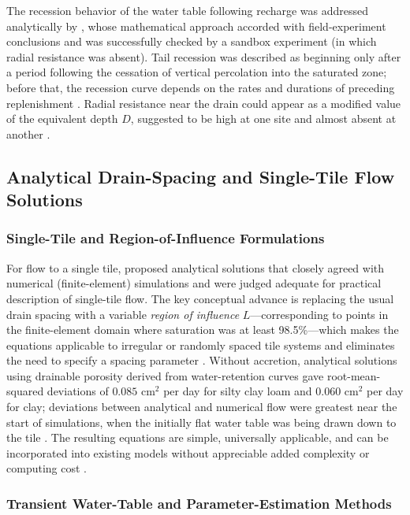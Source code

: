 \documentclass[11pt]{article}
\begin{document}
The recession behavior of the water table following recharge was addressed analytically
by \textcite{VANDELEUR1959}, whose mathematical approach accorded with field-experiment
conclusions and was successfully checked by a sandbox experiment (in which radial
resistance was absent). Tail recession was described as beginning only after a period
following the cessation of vertical percolation into the saturated zone; before that, the
recession curve depends on the rates and durations of preceding replenishment
\parencite{VANDELEUR1959}. Radial resistance near the drain could appear as a modified
value of the equivalent depth $D$, suggested to be high at one site and almost absent at
another \parencite{VANDELEUR1959}.

\subsection{Analytical Drain-Spacing and Single-Tile Flow Solutions}

\subsubsection{Single-Tile and Region-of-Influence Formulations}

For flow to a single tile, \textcite{Cooke2001} proposed analytical solutions that closely
agreed with numerical (finite-element) simulations and were judged adequate for practical
description of single-tile flow. The key conceptual advance is replacing the usual drain
spacing with a variable \emph{region of influence} $L$---corresponding to points in the
finite-element domain where saturation was at least 98.5\%---which makes the equations
applicable to irregular or randomly spaced tile systems and eliminates the need to specify
a spacing parameter \parencite{Cooke2001}. Without accretion, analytical solutions using
drainable porosity derived from water-retention curves gave root-mean-squared deviations
of $0.085$ cm$^2$ per day for silty clay loam and $0.060$ cm$^2$ per day for clay;
deviations between analytical and numerical flow were greatest near the start of
simulations, when the initially flat water table was being drawn down to the tile
\parencite{Cooke2001}. The resulting equations are simple, universally applicable, and can
be incorporated into existing models without appreciable added complexity or computing
cost \parencite{Cooke2001}.

\subsubsection{Transient Water-Table and Parameter-Estimation Methods}
\end{document}
